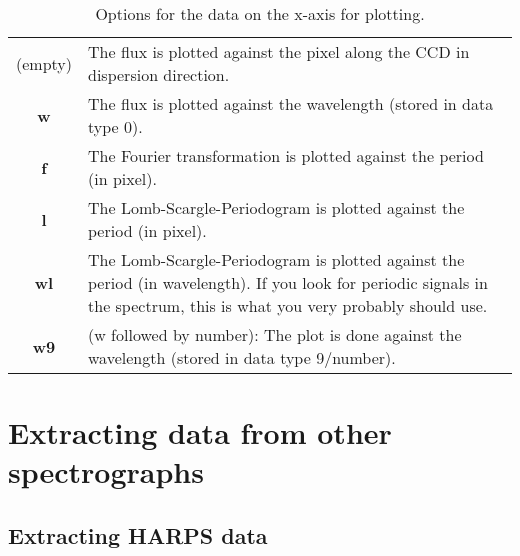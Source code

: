 \documentclass[10pt,a4paper]{article}
\begin{document}
\begin{table}[htb]
 \caption{Options for the data on the x-axis for plotting.\vspace{-0.9\baselineskip} }
 \label{Tab:plotting_options}
 \begin{tabularx}{\textwidth}{c X}
  (empty)    & The flux is plotted against the pixel along the CCD in dispersion direction.   \\
  \textbf{w} & The flux is plotted against the wavelength (stored in data type 0).   \\
  \textbf{f} & The Fourier transformation is plotted against the period (in pixel).    \\
  \textbf{l} & The Lomb-Scargle-Periodogram is plotted against the period (in pixel).   \\
  \textbf{wl} & The Lomb-Scargle-Periodogram is plotted against the period (in wavelength). If you look for periodic signals in the spectrum, this is what you very probably should use.    \\
  \textbf{w9} & (w followed by number): The plot is done against the wavelength (stored in data type 9/number).   \\
 \end{tabularx}
\end{table}






\newpage
\section{Extracting data from other spectrographs}

\subsection{Extracting HARPS data}
\end{document}
